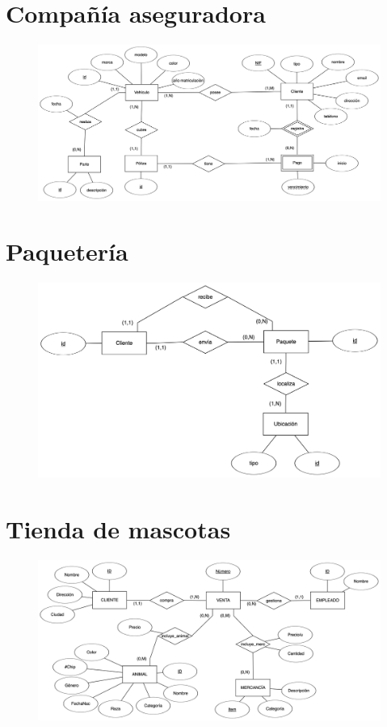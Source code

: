 \documentclass[a4paper]{article}
\begin{document}
\section{Compañía aseguradora}
\begin{figure}[H]
    \centering
    \includegraphics[width=\textwidth]{figs/ejercicio-1}
\end{figure}

\section{Paquetería}
\begin{figure}[H]
    \centering
    \includegraphics[width=\textwidth]{figs/ejercicio-2}
\end{figure}

\section{Tienda de mascotas}
\begin{figure}[H]
    \centering
    \includegraphics[width=\textwidth]{figs/ejercicio-3}
\end{figure}
\end{document}
